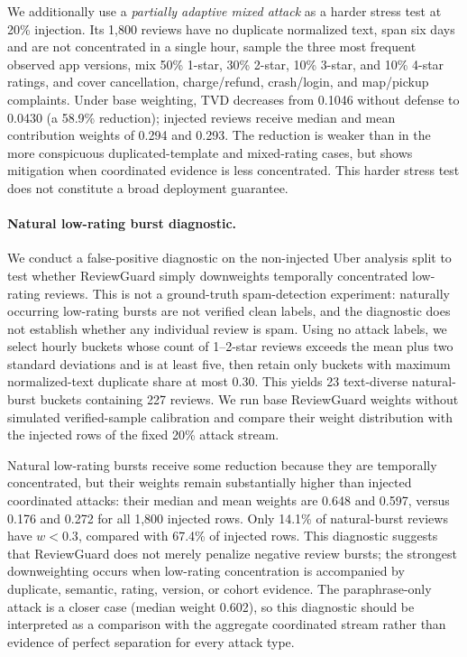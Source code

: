 \documentclass[runningheads]{llncs}
\begin{document}
We additionally use a \emph{partially adaptive mixed attack} as a harder stress test at 20\% injection. Its 1,800 reviews have no duplicate normalized text, span six days and are not concentrated in a single hour, sample the three most frequent observed app versions, mix 50\% 1-star, 30\% 2-star, 10\% 3-star, and 10\% 4-star ratings, and cover cancellation, charge/refund, crash/login, and map/pickup complaints. Under base weighting, TVD decreases from 0.1046 without defense to 0.0430 (a 58.9\% reduction); injected reviews receive median and mean contribution weights of 0.294 and 0.293. The reduction is weaker than in the more conspicuous duplicated-template and mixed-rating cases, but shows mitigation when coordinated evidence is less concentrated. This harder stress test does not constitute a broad deployment guarantee.

\paragraph{Natural low-rating burst diagnostic.}

We conduct a false-positive diagnostic on the non-injected Uber analysis split to test whether ReviewGuard simply downweights temporally concentrated low-rating reviews. This is not a ground-truth spam-detection experiment: naturally occurring low-rating bursts are not verified clean labels, and the diagnostic does not establish whether any individual review is spam. Using no attack labels, we select hourly buckets whose count of 1--2-star reviews exceeds the mean plus two standard deviations and is at least five, then retain only buckets with maximum normalized-text duplicate share at most 0.30. This yields 23 text-diverse natural-burst buckets containing 227 reviews. We run base ReviewGuard weights without simulated verified-sample calibration and compare their weight distribution with the injected rows of the fixed 20\% attack stream.

Natural low-rating bursts receive some reduction because they are temporally concentrated, but their weights remain substantially higher than injected coordinated attacks: their median and mean weights are 0.648 and 0.597, versus 0.176 and 0.272 for all 1,800 injected rows. Only 14.1\% of natural-burst reviews have \(w<0.3\), compared with 67.4\% of injected rows. This diagnostic suggests that ReviewGuard does not merely penalize negative review bursts; the strongest downweighting occurs when low-rating concentration is accompanied by duplicate, semantic, rating, version, or cohort evidence. The paraphrase-only attack is a closer case (median weight 0.602), so this diagnostic should be interpreted as a comparison with the aggregate coordinated stream rather than evidence of perfect separation for every attack type.
\end{document}
